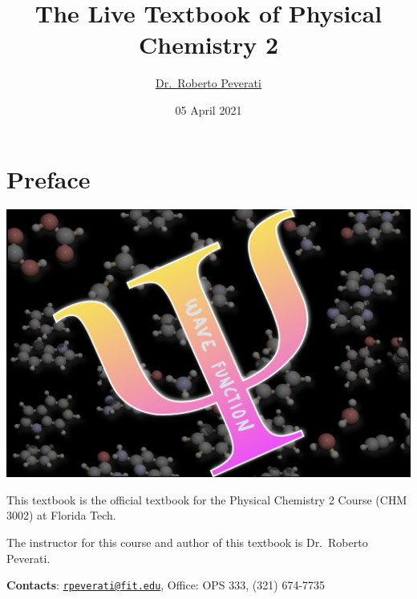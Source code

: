 \documentclass[
  9pt,
]{extbook}
\title{The Live Textbook of Physical Chemistry 2}
\author{\href{mailto:rpeverati@fit.edu}{Dr.~Roberto Peverati}}
\date{05 April 2021}
\let\oldmaketitle\maketitle
\theoremstyle{definition}
\theoremstyle{definition}
\theoremstyle{definition}
\theoremstyle{remark}
\begin{document}
\maketitle


%
\newpage

\let\maketitle\oldmaketitle

\renewcommand\thepage{\romannumeral\numexpr\value{page}-1\relax}


{
\setcounter{tocdepth}{1}
\tableofcontents
}
\renewcommand{\arraystretch}{1.8}

\hypertarget{preface}{%
\chapter*{Preface}\label{preface}}

\begin{center}\includegraphics[width=0.8\linewidth]{./img/OEP_Figures.000} \end{center}

This textbook is the official textbook for the Physical Chemistry 2 Course (CHM 3002) at Florida Tech.

The instructor for this course and author of this textbook is Dr.~Roberto Peverati.

\textbf{Contacts}: \href{mailto:rpeverati@fit.edu}{\nolinkurl{rpeverati@fit.edu}}, Office: OPS 333, (321) 674-7735
\end{document}

